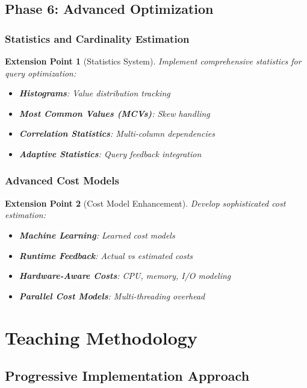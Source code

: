 \documentclass[12pt,a4paper]{article}
\newtheorem{extension}{Extension Point}[section]
\begin{document}
\subsection{Phase 6: Advanced Optimization}

\subsubsection{Statistics and Cardinality Estimation}

\begin{extension}[Statistics System]
Implement comprehensive statistics for query optimization:

\begin{itemize}
    \item \textbf{Histograms}: Value distribution tracking
    \item \textbf{Most Common Values (MCVs)}: Skew handling
    \item \textbf{Correlation Statistics}: Multi-column dependencies
    \item \textbf{Adaptive Statistics}: Query feedback integration
\end{itemize}
\end{extension}

\subsubsection{Advanced Cost Models}

\begin{extension}[Cost Model Enhancement]
Develop sophisticated cost estimation:

\begin{itemize}
    \item \textbf{Machine Learning}: Learned cost models
    \item \textbf{Runtime Feedback}: Actual vs estimated costs
    \item \textbf{Hardware-Aware Costs}: CPU, memory, I/O modeling
    \item \textbf{Parallel Cost Models}: Multi-threading overhead
\end{itemize}
\end{extension}

\section{Teaching Methodology}

\subsection{Progressive Implementation Approach}
\end{document}
